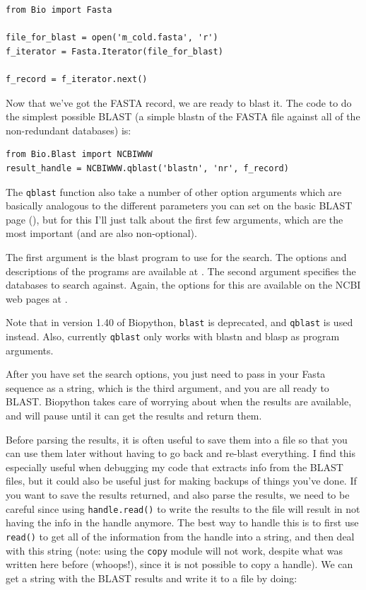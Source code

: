 \documentclass{report}
\begin{document}
\begin{verbatim}
from Bio import Fasta

file_for_blast = open('m_cold.fasta', 'r')
f_iterator = Fasta.Iterator(file_for_blast)

f_record = f_iterator.next()
\end{verbatim}

Now that we've got the FASTA record, we are ready to blast it. The
code to do the simplest possible BLAST (a simple blastn of the
FASTA file against all of the non-redundant databases) is:

\begin{verbatim}
from Bio.Blast import NCBIWWW
result_handle = NCBIWWW.qblast('blastn', 'nr', f_record)
\end{verbatim}

The \verb|qblast| function also take a number of other option arguments
which are basically analogous to the different parameters you can set
on the basic BLAST page
(),
but for this I'll just talk about the first few arguments, which are
the most important (and are also non-optional).


The first argument is the blast program to use for the search. The
options and descriptions of the programs are available at
.
The second argument specifies the databases to search against. Again,
the options for this are available on the NCBI web pages at
.

Note that in version 1.40 of Biopython, \verb|blast| is deprecated, and
\verb|qblast| is used instead. Also, currently \verb|qblast| only works with blastn
and blasp as program arguments.

After you have set the search options, you just need to pass in your
Fasta sequence as a string, which is the third argument, and you are
all ready to BLAST. Biopython takes care of worrying about when the
results are available, and will pause until it can get the results and
return them.


Before parsing the results, it is often useful to save them into a
file so that you can use them later without having to go back and
re-blast everything. I find this especially useful when debugging my
code that extracts info from the BLAST files, but it could also be
useful just for making backups of things you've done. If you want to
save the results returned, and also parse the results, we need to be
careful since using \verb|handle.read()| to write the results to the
file will result in not having the info in the handle anymore. The
best way to handle this is to first use \verb|read()| to get all of
the information from the handle into a string, and then deal with this 
string (note: using the \verb|copy| module will not work, despite what 
was written here before (whoops!), since it is not possible to copy a
handle). We can get a string with the BLAST results and write it to a
file by doing:
\end{document}
